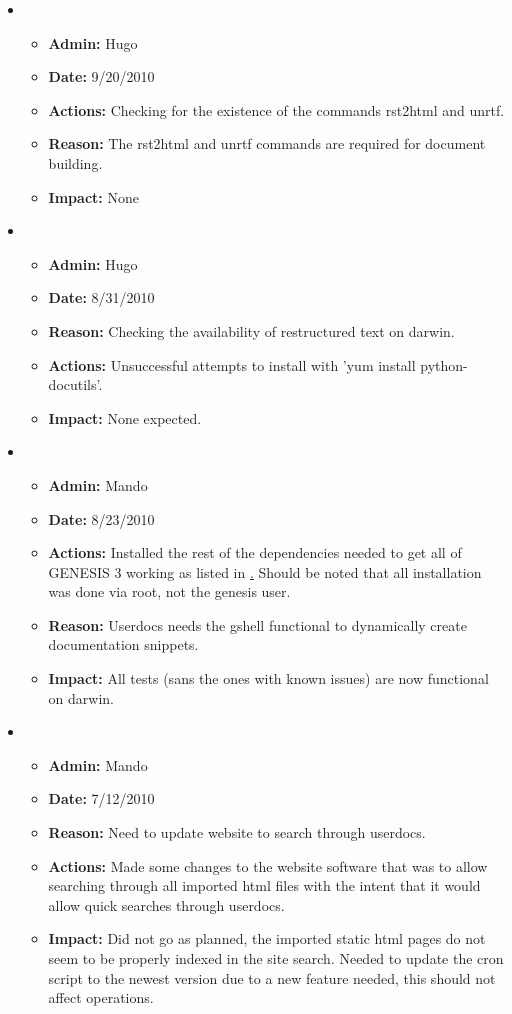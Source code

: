 \documentclass[12pt]{article}
\begin{document}
\begin{itemize}
\item 
\begin{itemize}
\item[] {\bf Admin:} Hugo
\item[] {\bf Date:} 9/20/2010 
\item[] {\bf Actions:} Checking for the existence of the commands
  rst2html and unrtf. 
\item[] {\bf Reason:} The rst2html and unrtf commands are required for
  document building.
\item[] {\bf Impact:} None
\end{itemize}
	
\item 
\begin{itemize}
\item[] {\bf Admin:} Hugo
\item[] {\bf Date:} 8/31/2010
\item[] {\bf Reason:} Checking the availability of restructured text on darwin.
\item[] {\bf Actions:} Unsuccessful attempts to install with 'yum install python-docutils'.
\item[] {\bf Impact:} None expected.
\end{itemize}

\item 
\begin{itemize}
\item[] {\bf Admin:} Mando
\item[] {\bf Date:} 8/23/2010
\item[] {\bf Actions:} Installed the rest of the dependencies needed to get all of GENESIS 3 working as listed in \href{../installation-fedora12/installation-fedora12.tex}. Should be noted that all installation was done via root, not the genesis user.
\item[] {\bf Reason:} Userdocs needs the gshell functional to dynamically create documentation snippets. 
\item[] {\bf Impact:} All tests (sans the ones with known issues) are now functional on darwin.
\end{itemize}
	
\item 
\begin{itemize}
\item[] {\bf Admin:} Mando
\item[] {\bf Date:} 7/12/2010
\item[] {\bf Reason:} Need to update website to search through userdocs. 
\item[] {\bf Actions:} Made some changes to the website software that was to allow searching through all imported html files with the intent that it would allow quick searches through userdocs.  
\item[] {\bf Impact:} Did not go as planned, the imported static html pages do not seem to be properly indexed in the site search. Needed to update the cron script to the newest version due to a new feature needed, this should not affect operations.
\end{itemize}


\end{itemize}
\end{document}
